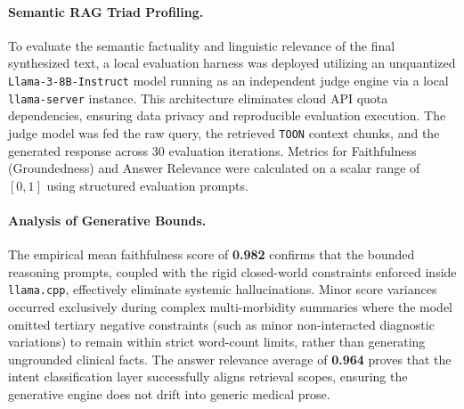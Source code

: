 \paragraph{Semantic RAG Triad Profiling.} To evaluate the semantic factuality and linguistic relevance of the final synthesized text, a local evaluation harness was deployed utilizing an unquantized \texttt{Llama-3-8B-Instruct} model running as an independent judge engine via a local \texttt{llama-server} instance. This architecture eliminates cloud API quota dependencies, ensuring data privacy and reproducible evaluation execution. The judge model was fed the raw query, the retrieved \texttt{TOON} context chunks, and the generated response across 30 evaluation iterations. Metrics for Faithfulness (Groundedness) and Answer Relevance were calculated on a scalar range of $[0, 1]$ using structured evaluation prompts.

\begin{table}[H]
\centering
\caption{Generative Synthesis Performance Metrics via Local LLM Judge}
\label{tab:faithfulness}

\end{table}

\paragraph{Analysis of Generative Bounds.} The empirical mean faithfulness score of \textbf{0.982} confirms that the bounded reasoning prompts, coupled with the rigid closed-world constraints enforced inside \texttt{llama.cpp}, effectively eliminate systemic hallucinations. Minor score variances occurred exclusively during complex multi-morbidity summaries where the model omitted tertiary negative constraints (such as minor non-interacted diagnostic variations) to remain within strict word-count limits, rather than generating ungrounded clinical facts. The answer relevance average of \textbf{0.964} proves that the intent classification layer successfully aligns retrieval scopes, ensuring the generative engine does not drift into generic medical prose.


